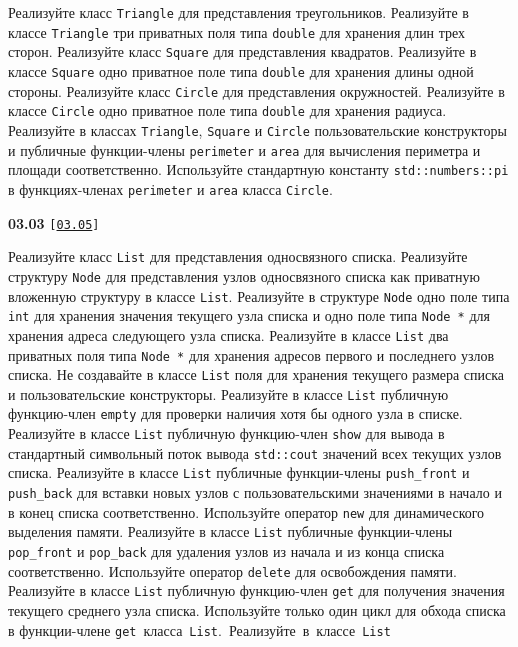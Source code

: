 \documentclass[a4paper,12pt]{article}
\begin{document}
Реализуйте класс \lstinline{Triangle} для представления треугольников. Реализуйте в классе \lstinline{Triangle} три приватных поля типа \lstinline{double} для хранения длин трех сторон. Реализуйте класс \lstinline{Square} для представления квадратов. Реализуйте в классе \lstinline{Square} одно приватное поле типа \lstinline{double} для хранения длины одной стороны. Реализуйте класс \lstinline{Circle} для представления окружностей. Реализуйте в классе \lstinline{Circle} одно приватное поле типа \lstinline{double} для хранения радиуса. Реализуйте в классах \lstinline{Triangle}, \lstinline{Square} и \lstinline{Circle} пользовательские конструкторы и публичные функции-члены \lstinline{perimeter} и \lstinline{area} для вычисления периметра и площади соответственно. Используйте стандартную константу \lstinline{std::numbers::pi} в функциях-членах \lstinline{perimeter} и \lstinline{area} класса \lstinline{Circle}.

\bigskip

{\large \textbf{03.03} \texttt{[\href{https://github.com/i-s-m-mipt/Education/blob/master/projects/examples/source/03.05.cpp}{\texttt{03.05}}]}}

\bigskip

Реализуйте класс \lstinline{List} для представления односвязного списка. Реализуйте структуру \lstinline{Node} для представления узлов односвязного списка как приватную вложенную структуру в классе \lstinline{List}. Реализуйте в структуре \lstinline{Node} одно поле типа \lstinline{int} для хранения значения текущего узла списка и одно поле типа \lstinline{Node *} для хранения адреса следующего узла списка. Реализуйте в классе \lstinline{List} два приватных поля типа \lstinline{Node *} для хранения адресов первого и последнего узлов списка. Не создавайте в классе \lstinline{List} поля для хранения текущего размера списка и пользовательские конструкторы. Реализуйте в классе \lstinline{List} публичную функцию-член \lstinline{empty} для проверки наличия хотя бы одного узла в списке. Реализуйте в классе \lstinline{List} публичную функцию-член \lstinline{show} для вывода в стандартный символьный поток вывода \lstinline{std::cout} значений всех текущих узлов списка. Реализуйте в классе \lstinline{List} публичные функции-члены \lstinline{push_front} и \lstinline{push_back} для вставки новых узлов с пользовательскими значениями в начало и в конец списка соответственно. Используйте оператор \lstinline{new} для динамического выделения памяти. Реализуйте в классе \lstinline{List} публичные функции-члены \lstinline{pop_front} и \lstinline{pop_back} для удаления узлов из начала и из конца списка соответственно. Используйте оператор \lstinline{delete} для освобождения памяти. Реализуйте в классе \lstinline{List} публичную функцию-член \lstinline{get} для получения значения текущего среднего узла списка. Используйте только один цикл для обхода списка в функции-члене \lstinline{get}~класса~\lstinline{List}.~Реализуйте~в~классе~\lstinline{List} 
\end{document}
